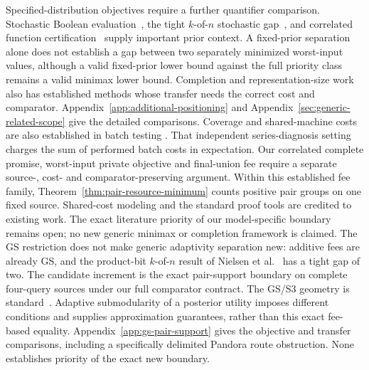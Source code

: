 \documentclass[pdflatex,sn-mathphys-num]{sn-jnl}
\theoremstyle{thmstyleone}
\theoremstyle{thmstylethree}
\theoremstyle{thmstyletwo}
\begin{document}
Specified-distribution objectives require a further quantifier comparison.
Stochastic Boolean evaluation~\cite{hellerstein2022adaptivity}, the tight
$k$-of-$n$ stochastic gap~\cite{nielsen2025kofn}, and correlated function
certification~\cite{ghuge2026correlations} supply important prior context.
A fixed-prior separation alone does not establish a gap between two
separately minimized worst-input values, although a valid fixed-prior
lower bound against the full priority class remains a valid minimax
lower bound. Completion and representation-size work also has established
methods whose transfer needs the correct cost and comparator.
Appendix~\ref{app:additional-positioning} and
Appendix~\ref{sec:generic-related-scope} give the detailed comparisons.
Coverage and shared-machine costs are also established in batch testing
\cite{harris2025}. That independent series-diagnosis setting charges the
sum of performed batch costs in expectation. Our correlated complete
promise, worst-input private objective and final-union fee require a
separate source-, cost- and comparator-preserving argument.
Within this established fee family,
Theorem~\ref{thm:pair-resource-minimum} counts positive pair groups on one
fixed source. Shared-cost modeling and the standard proof tools are
credited to existing work.
The exact literature priority of our model-specific boundary remains open;
no new generic minimax or completion framework is claimed.
The GS restriction does not make generic adaptivity separation new:
additive fees are already GS, and the product-bit $k$-of-$n$ result
of Nielsen et al.~\cite[Theorem 1]{nielsen2025kofn} has a tight gap
of two. The candidate increment is the exact pair-support boundary
on complete four-query sources under our full comparator contract.
The GS/S3 geometry is standard~\cite{hajek2008substitutes}.
Adaptive submodularity of a posterior utility
\cite{golovin2017adaptive} imposes different conditions and supplies
approximation guarantees, rather than this exact fee-based equality.
Appendix~\ref{app:gs-pair-support} gives the objective and transfer
comparisons, including a specifically delimited Pandora route
obstruction. None establishes priority of the exact new boundary.
\end{document}
